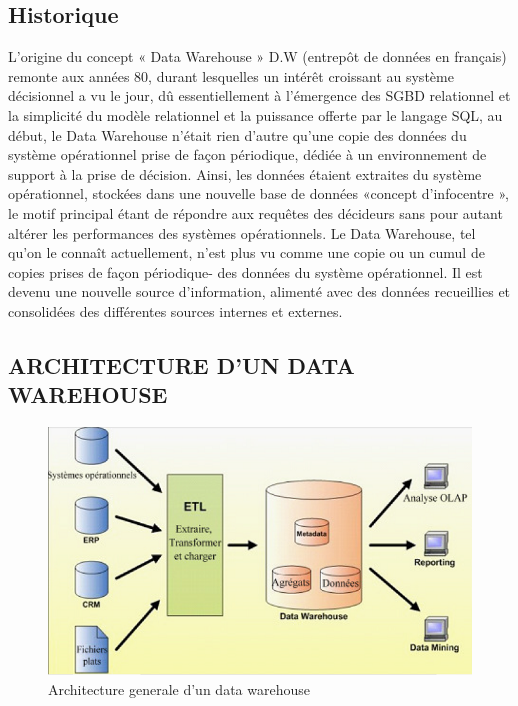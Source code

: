  \subsection{Historique}
 	L’origine du concept « Data Warehouse » D.W (entrepôt de données en français) remonte aux années 80, durant lesquelles un intérêt croissant au système décisionnel a vu le jour, dû essentiellement à l’émergence des SGBD relationnel et la simplicité du modèle relationnel et la puissance offerte par le langage SQL, au début, le Data Warehouse n’était rien d’autre qu’une copie des données du système opérationnel prise de façon périodique, dédiée à un environnement de support à la prise de décision. Ainsi, les données étaient extraites du système opérationnel, stockées dans une nouvelle base de données «concept d’infocentre », le motif principal étant de répondre aux requêtes des décideurs sans pour autant altérer les performances des systèmes opérationnels. Le Data Warehouse, tel qu’on le connaît actuellement, n’est plus vu comme une copie ou un cumul de copies prises de façon périodique- des données du système opérationnel. Il est devenu une nouvelle source d’information, alimenté avec des données recueillies et consolidées des différentes sources internes et externes.
 
 \subsection{ARCHITECTURE D’UN DATA WAREHOUSE}
 
 	\begin{figure}[h]
	\begin{center}
		\includegraphics[scale=0.85]{images/DataWH.png}
		\caption{Architecture generale d'un data warehouse}
		\label{architecture-data-warehouse}
	\end{center}
\end{figure}

